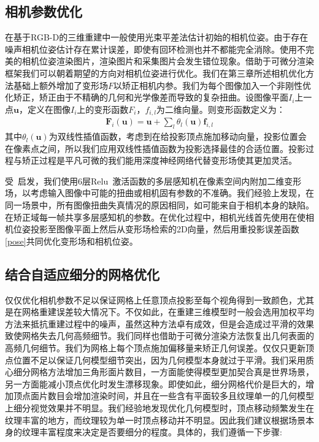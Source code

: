 %
\subsection{相机参数优化}
在基于RGB-D的三维重建中一般使用光束平差法估计初始的相机位姿。由于存在噪声相机位姿估计存在累计误差，即使有回环检测也并不都能完全消除。使用不完美的相机位姿渲染图片，渲染图片和采集图片会发生错位现象。借助于可微分渲染框架我们可以朝着期望的方向对相机位姿进行优化。我们在第三章所述相机优化方法基础上额外增加了变形场$F$以矫正相机内参。我们为每个图像加入一个非刚性优化矫正，矫正由于不精确的几何和光学像差而导致的复杂扭曲。设图像平面$I_i$上一点$\mathbf{u}$，定义在图像$I_i$上的变形函数$F_i$，$f_{i,l}$为二维向量。则变形函数定义为：
\begin{align}
	\mathbf{F}_{i}(\mathbf{u})=\mathbf{u}+\sum_{l} \theta_{l}(\mathbf{u}) \mathbf{f}_{i, l}
\end{align}
其中$\theta_{l}(\mathbf{u})$为双线性插值函数，考虑到在给投影顶点施加移动向量，投影位置会在像素点之间，所以我们应用双线性插值函数为投影选择最佳的合适位置。投影过程与矫正过程是平凡可微的我们能用深度神经网络代替变形场使其更加灵活。
\par
受~\cite{DejanAzinovic2021NeuralRS}启发，我们使用6层Relu~\cite{agarap2018deep}激活函数的多层感知机在像素空间内附加二维变形场，以考虑输入图像中可能的扭曲或相机固有参数的不准确。我们经验上发现，在同一场景中，所有图像扭曲失真情况的原因相同，如可能来自于相机本身的缺陷。在矫正域每一帧共享多层感知机的参数。在优化过程中，相机光线首先使用在使相机位姿投影至图像平面上然后从变形场检索的2D向量，然后用重投影误差函数\eqref{pose}共同优化变形场和相机位姿。

%
\subsection{结合自适应细分的网格优化}
仅仅优化相机参数不足以保证网格上任意顶点投影至每个视角得到一致颜色，尤其是在网格重建误差较大情况下。不仅如此，在重建三维模型时一般会选用加权平均方法来抵抗重建过程中的噪声，虽然这种方法卓有成效，但是会造成过平滑的效果致使网格失去几何高频细节。我们同样也借助于可微分渲染方法恢复出几何表面的高频几何细节。我们为网格上每个顶点施加偏移量来矫正几何误差。仅仅只更新顶点位置不足以保证几何模型细节突出，因为几何模型本身就过于平滑。我们采用质心细分网格方法增加三角形面片数目，一方面能使得模型更加契合真是世界场景，另一方面能减小顶点优化时发生漂移现象。即使如此，细分网格代价是巨大的，增加顶点面片数目会增加渲染时间，并且在一些含有平面较多且纹理单一的几何模型上细分视觉效果并不明显。我们经验地发现优化几何模型时，顶点移动频繁发生在纹理丰富的地方，而纹理较为单一时顶点移动并不明显。因此我们建议根据场景本身的纹理丰富程度来决定是否要细分的程度。具体的，我们遵循一下步骤:

